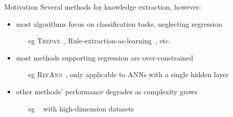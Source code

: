 \documentclass[presentation]{beamer}
\begin{document}
\begin{frame}[c]{Motivation}
	Several methods for knowledge extraction, however:
    \vfill
    \begin{itemize}
        \item most algorithms focus on classification tasks, neglecting regression
        \begin{itemize}
            \item[eg] \textsc{Trepan}~, Rule-extraction-as-learning~, etc.
        \end{itemize}
        
        \vfill
        
        \item most methods supporting regression are over-constrained
        \begin{itemize}
            \item[eg] \textsc{RefAnn}~, only applicable to ANNs with a single hidden layer
        \end{itemize}
        
        \vfill
        
        \item other methods' performance degrades as complexity grows
        \begin{itemize}
			\item[eg] \iter~ with high-dimension datasets
		\end{itemize}
        
    \end{itemize}
\end{frame}
\end{document}
